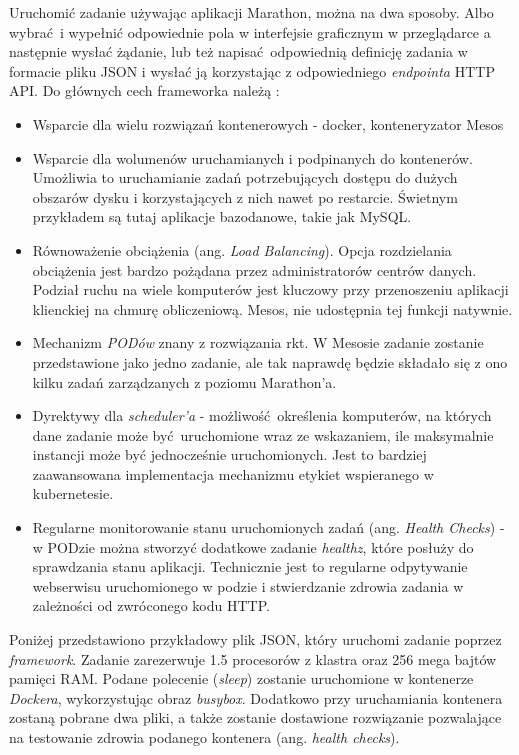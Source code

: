 \documentclass[10pt,a4paper,titlepage,twoside]{report}
\begin{document}
Uruchomić zadanie używając aplikacji Marathon, można na dwa sposoby. Albo wybrać i wypełnić odpowiednie pola w interfejsie graficznym w przeglądarce a następnie wysłać żądanie, lub też napisać odpowiednią definicję zadania w formacie pliku JSON i wysłać ją korzystając z odpowiedniego \textit{endpointa} HTTP API.
Do głównych cech frameworka należą \cite{ad41}:
\begin{itemize}
\item Wsparcie dla wielu rozwiązań kontenerowych - docker, konteneryzator Mesos
\item Wsparcie dla wolumenów uruchamianych i podpinanych do kontenerów. Umożliwia to uruchamianie zadań potrzebujących dostępu do dużych obszarów dysku i korzystających z nich nawet po restarcie. Świetnym przykładem są tutaj aplikacje bazodanowe, takie jak MySQL.
\item Równoważenie obciążenia (ang. \textit{Load Balancing}). Opcja rozdzielania obciążenia jest bardzo pożądana przez administratorów centrów danych. Podział ruchu na wiele komputerów jest kluczowy przy przenoszeniu aplikacji klienckiej na chmurę obliczeniową. Mesos, nie udostępnia tej funkcji natywnie.
\item Mechanizm \textit{PODów} znany z rozwiązania rkt. W Mesosie zadanie zostanie przedstawione jako jedno zadanie, ale tak naprawdę będzie składało się z ono kilku zadań zarządzanych z poziomu Marathon'a.
\item Dyrektywy dla \textit{scheduler'a} - możliwość określenia komputerów, na których dane zadanie może być uruchomione wraz ze wskazaniem, ile maksymalnie instancji może być jednocześnie uruchomionych. Jest to bardziej zaawansowana implementacja mechanizmu etykiet wspieranego w kubernetesie.
\item Regularne monitorowanie stanu uruchomionych zadań (ang. \textit{Health Checks}) - w PODzie można stworzyć dodatkowe zadanie \textit{healthz}, które posłuży do sprawdzania stanu aplikacji. Technicznie jest to regularne odpytywanie webserwisu uruchomionego w podzie i stwierdzanie zdrowia zadania w zależności od zwróconego kodu HTTP.
\end{itemize}

Poniżej przedstawiono przykładowy plik JSON, który uruchomi zadanie poprzez \textit{framework}. Zadanie zarezerwuje 1.5 procesorów z klastra oraz 256 mega bajtów pamięci RAM. Podane polecenie (\textit{sleep}) zostanie uruchomione w kontenerze \textit{Dockera}, wykorzystując obraz \textit{busybox}. Dodatkowo przy uruchamiania kontenera zostaną pobrane dwa pliki, a także zostanie dostawione rozwiązanie pozwalające na testowanie zdrowia podanego kontenera (ang. \textit{health checks}). 
\end{document}
